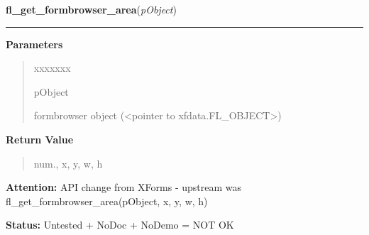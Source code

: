 \hspace{.8\funcindent}\begin{boxedminipage}{\funcwidth}

    \raggedright \textbf{fl\_get\_formbrowser\_area}(\textit{pObject})

    \vspace{-1.5ex}

    \rule{\textwidth}{0.5\fboxrule}
\setlength{\parskip}{2ex}
\setlength{\parskip}{1ex}
      \textbf{Parameters}
      \vspace{-1ex}

      \begin{quote}
        \begin{Ventry}{xxxxxxx}

          \item[pObject]

          formbrowser object ({\textless}pointer to 
          xfdata.FL\_OBJECT{\textgreater})

        \end{Ventry}

      \end{quote}

      \textbf{Return Value}
    \vspace{-1ex}

      \begin{quote}
      num., x, y, w, h

      \end{quote}

\textbf{Attention:} API change from XForms - upstream was fl\_get\_formbrowser\_area(pObject, 
x, y, w, h)



\textbf{Status:} Untested + NoDoc + NoDemo = NOT OK



    \end{boxedminipage}

    \label{xformslib:library:fl_set_formbrowser_scroll}

    \vspace{0.5ex}

